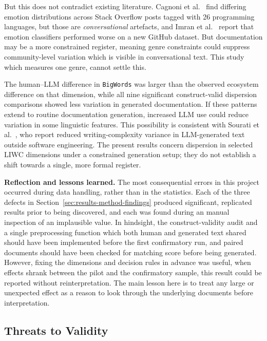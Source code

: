 \documentclass[conference]{IEEEtran}
\begin{document}
But this does not contradict existing literature. Cagnoni et al.~\cite{cagnoni2020} find differing emotion distributions across Stack Overflow posts tagged with 26 programming languages, but those are \emph{conversational} artefacts, and Imran et al.~\cite{mohammad2022} report that emotion classifiers performed worse on a new GitHub dataset. But documentation may be a more constrained register, meaning genre constraints could suppress community-level variation which is visible in conversational text. This study which measures one genre, cannot settle this.

The human--LLM difference in \texttt{BigWords} was larger than the observed ecosystem difference on that dimension, while all nine significant construct-valid dispersion comparisons showed less variation in generated documentation. If these patterns extend to routine documentation generation, increased LLM use could reduce variation in some linguistic features. This possibility is consistent with Sourati et al.~\cite{sourati2026}, who report reduced writing-complexity variance in LLM-generated text outside software engineering. The present results concern dispersion in selected LIWC dimensions under a constrained generation setup; they do not establish a shift towards a single, more formal register.

\textbf{Reflection and lessons learned.} The most consequential errors in this project occurred during data handling, rather than in the statistics. Each of the three defects in Section~\ref{sec:results-method-findings} produced significant, replicated results prior to being discovered, and each was found during an manual inspection of an implausible value. In hindsight, the construct-validity audit and a single preprocessing function which both human and generated text shared should have been implemented before the first confirmatory run, and paired documents should have been checked for matching score before being generated. However, fixing the dimensions and decision rules in advance was useful, when effects shrank between the pilot and the confirmatory sample, this result could be reported without reinterpretation. The main lesson here is to treat any large or unexpected effect as a reason to look through the underlying documents before interpretation.

\subsection{Threats to Validity}
\end{document}
